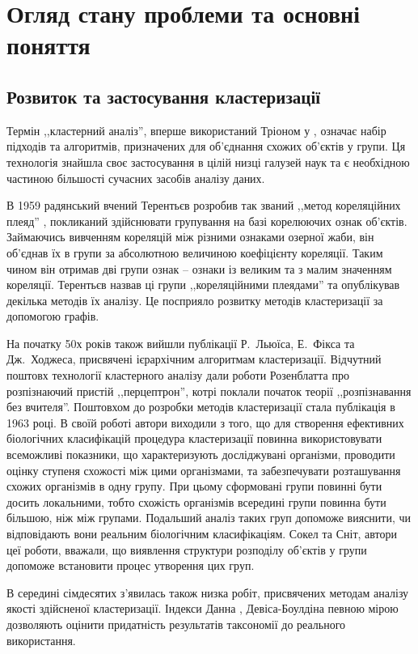 \chapter{Огляд стану проблеми та основні поняття}\label{ch:01}

\section{Розвиток та застосування кластеризації}
    Термін ,,кластерний аналіз'', вперше використаний Тріоном у \cite{Tryon:Cluster:1939}, означає набір підходів та алгоритмів, призначених для об'єднання схожих об'єктів у групи. Ця технологія знайшла своє застосування в цілій низці галузей наук та є необхідною частиною більшості сучасних засобів аналізу даних.
 
    В 1959 радянський вчений Терентьєв розробив так званий ,,метод кореляційних плеяд'' \cite{Terentyev}, покликаний здійснювати групування на базі корелюючих ознак об'єктів. Займаючись вивченням кореляцій між різними ознаками озерної жаби, він об'єднав їх в групи за абсолютною величиною коефіцієнту кореляції. Таким чином він отримав дві групи ознак -- ознаки із великим та з малим значенням кореляції. Терентьєв назвав ці групи ,,кореляційними плеядами'' та опублікував декілька методів їх аналізу. Це посприяло розвитку методів кластеризації за допомогою графів.
    
    На початку 50х років також вийшли публікації Р.~Льюїса, Е.~Фікса та Дж.~Ходжеса, присвячені ієрархічним алгоритмам кластеризації. Відчутний поштовх технології кластерного аналізу дали роботи Розенблатта про розпізнаючий пристій ,,перцептрон'', котрі поклали початок теорії ,,розпізнавання без вчителя''. Поштовхом до розробки методів кластеризації стала публікація \cite{SokalSneath} в 1963 році. В своїй роботі автори виходили з того, що для створення ефективних біологічних класифікацій процедура кластеризації повинна використовувати всеможливі показники, що характеризують досліджувані організми, проводити оцінку ступеня схожості між цими організмами, та забезпечувати розташування схожих організмів в одну групу. При цьому сформовані групи повинні бути досить локальними, тобто схожість організмів всередині групи повинна бути більшою, ніж між групами. Подальший аналіз таких груп допоможе вияснити, чи відповідають вони реальним біологічним класифікаціям. Сокел та Сніт, автори цеї роботи, вважали, що виявлення структури розподілу об'єктів у групи допоможе встановити процес утворення цих груп.
    
    В середині сімдесятих з'явилась також низка робіт, присвячених методам аналізу якості здійсненої кластеризації. Індекси Данна \cite{Dunn}, Девіса-Боулдіна \cite{DavisBouldin} певною мірою дозволяють оцінити придатність результатів таксономії до реального використання.
    
